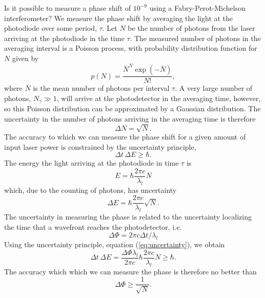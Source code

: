 Is it possible to measure a phase shift of $10^{-9}$ using a
Fabry-Perot-Michelson interferometer? We measure the phase shift by averaging
the light at the photodiode over some period, $\tau$. Let $N$ be the number of
photons from the laser arriving at the photodiode in the time $\tau$. The
measured number of photons in the averaging interval is a Poisson process,
with probability distribution function for $N$ given by
\begin{equation}
p(N) = \frac{ \bar{N} ^{N} \exp \left(-\bar{N}\right) } {N!},
\end{equation}
where $\bar{N}$ is the mean number of photons per interval $\tau$. A very
large number of photons, $N_\gamma \gg 1$, will arrive at the photodetector in
the averaging time, however, so this Poisson distribution can be approximated
by a Gaussian distribution. The uncertainty in the number of photons arriving in the
averaging time is therefore
\begin{equation}
\Delta N = \sqrt{N}.
\end{equation}
The accuracy to which we can measure the phase shift for a given amount of input
laser power is constrained by the uncertainty principle,
\begin{equation}
\Delta t \, \Delta E \ge \hbar.
\label{eq:uncertainty}
\end{equation}
The energy the light arriving at the photodiode in time $\tau$ is
\begin{equation}
E = \hbar \frac{2\pi c}{\lambda_l} N
\end{equation}
which, due to the counting of photons, has uncertainty 
\begin{equation}
\Delta E = \hbar \frac{2\pi c}{\lambda_l} \sqrt{N}.
\label{eq:uncertdeltae}
\end{equation}
The uncertainty in measuring the phase is related to the uncertainty
localizing the time that a wavefront reaches the photodetector, i.e.
\begin{equation}
\Delta\Phi = 2\pi c \Delta t / \lambda_l
\end{equation}
Using the uncertainty principle, equation (\ref{eq:uncertainty}), we obtain
\begin{equation}
\Delta t \, \Delta E = \frac{\Delta \Phi \lambda_l}{2\pi c} \hbar \frac{2\pi
c}{\lambda_l} N \ge \hbar.
\end{equation}
The accuracy which which we can measure the phase is therefore no better than
\begin{equation}
\Delta \Phi \ge \frac{1}{\sqrt{N}}.
\end{equation}

